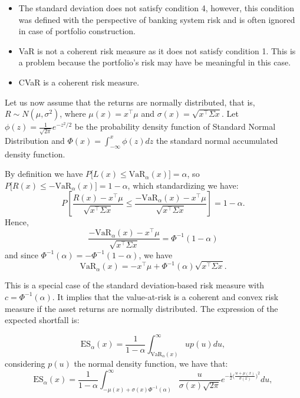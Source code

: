 \begin{remark}\normalfont \hspace{1cm}
	\begin{itemize}
		\item The standard deviation does not satisfy condition 4, however, this condition was defined with the perspective of banking system risk and is often ignored in case of portfolio construction.
		\item VaR is not a coherent risk measure as it does not satisfy condition 1. This is a problem because the portfolio’s risk may have be meaningful in this case.
		\item CVaR is a coherent risk measure.
	\end{itemize}
\end{remark}


Let us now assume that the returns are normally distributed, that is, $R\sim N(\mu,\sigma^2)$, where $\mu(x)=x^\top\mu$ and
$\sigma(x)=\sqrt{x^\top \Sigma x}$. Let $\phi(z) = \frac{1}{\sqrt{2\pi}}e^{-z^2/2}$ be the probability density function of Standard Normal Distribution and $\Phi(x) = \int_{-\infty}^{x}\phi(z) dz$
the standard normal accumulated density function.

By definition we have
$P\Big[L(x)\leq \mbox{VaR}_\alpha(x)\Big]=\alpha$, so
$P\Big[R(x)\leq -\mbox{VaR}_\alpha(x)\Big]=1-\alpha$, which standardizing
we have:
\[
	P\left[ \frac{R(x)-x^\top\mu}{\sqrt{x^\top \Sigma x}} \leq \frac{-\mbox{VaR}_\alpha(x)- x^\top\mu}{\sqrt{x^\top \Sigma x}}
		\right]=1-\alpha.
\]
Hence,
\[
	\frac{-\mbox{VaR}_\alpha(x)-x^\top\mu}{\sqrt{x^\top \Sigma x}}=\Phi^{-1}(1-\alpha)
\] and since $\Phi^{-1}(\alpha)=-\Phi^{-1}(1-\alpha)$, we have
\begin{equation}\label{eq:var2}
	\mbox{VaR}_\alpha(x)=-x^\top\mu+ \Phi^{-1}(\alpha)\sqrt{x^\top \Sigma x}.
\end{equation}

This is a special case of the standard deviation-based risk measure with $c = \Phi^{-1} (\alpha)$. It implies that the value-at-risk is a coherent and convex risk measure if the asset returns are normally distributed. The expression of the expected shortfall is:

\[
	\mbox{ES}_\alpha(x) = \frac{1}{1-\alpha}\int_{\mbox{VaR}_\alpha(x)}^\infty u p(u)du,
\] considering $p(u)$ the normal density function, we have that:
\[
	\mbox{ES}_\alpha(x) = \frac{1}{1-\alpha}\int_{-\mu(x)+ \sigma(x)\Phi^{-1}(\alpha)} ^\infty \frac{u}{\sigma(x)\sqrt{2\pi}} e^{-\frac{1}{2}\Big(\frac{u+\mu(x)}{\sigma (x)}\Big)^2} du,
\]

